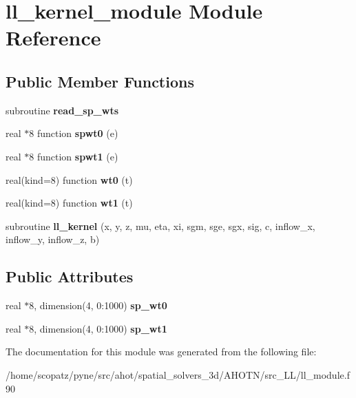\hypertarget{classll__kernel__module}{\section{ll\-\_\-kernel\-\_\-module Module Reference}
\label{classll__kernel__module}
}
\subsection*{Public Member Functions}
\begin{DoxyCompactItemize}
\item 
\hypertarget{classll__kernel__module_ae64b1d2d995c0e8c9d1014c83252100a}{subroutine {\bfseries read\-\_\-sp\-\_\-wts}}\label{classll__kernel__module_ae64b1d2d995c0e8c9d1014c83252100a}

\item 
\hypertarget{classll__kernel__module_abd3403d056c55f29237c37458c205516}{real $\ast$8 function {\bfseries spwt0} (e)}\label{classll__kernel__module_abd3403d056c55f29237c37458c205516}

\item 
\hypertarget{classll__kernel__module_a79e47a1da308cac21d2f614706b336a5}{real $\ast$8 function {\bfseries spwt1} (e)}\label{classll__kernel__module_a79e47a1da308cac21d2f614706b336a5}

\item 
\hypertarget{classll__kernel__module_a0f8329a7949f76c5316682e710a76f11}{real(kind=8) function {\bfseries wt0} (t)}\label{classll__kernel__module_a0f8329a7949f76c5316682e710a76f11}

\item 
\hypertarget{classll__kernel__module_a8e6ae1b763dd657b55e2eba5bd311e2f}{real(kind=8) function {\bfseries wt1} (t)}\label{classll__kernel__module_a8e6ae1b763dd657b55e2eba5bd311e2f}

\item 
\hypertarget{classll__kernel__module_a27d3794c74e14ccbb0297fd8ebdccdd3}{subroutine {\bfseries ll\-\_\-kernel} (x, y, z, mu, eta, xi, sgm, sge, sgx, sig, c, inflow\-\_\-x, inflow\-\_\-y, inflow\-\_\-z, b)}\label{classll__kernel__module_a27d3794c74e14ccbb0297fd8ebdccdd3}

\end{DoxyCompactItemize}
\subsection*{Public Attributes}
\begin{DoxyCompactItemize}
\item 
\hypertarget{classll__kernel__module_a4f8600d6061bd3d372282cac9efbab25}{real $\ast$8, dimension(4, 0\-:1000) {\bfseries sp\-\_\-wt0}}\label{classll__kernel__module_a4f8600d6061bd3d372282cac9efbab25}

\item 
\hypertarget{classll__kernel__module_ae9ebcee33ee11a014a911c8f1552c216}{real $\ast$8, dimension(4, 0\-:1000) {\bfseries sp\-\_\-wt1}}\label{classll__kernel__module_ae9ebcee33ee11a014a911c8f1552c216}

\end{DoxyCompactItemize}


The documentation for this module was generated from the following file\-:\begin{DoxyCompactItemize}
\item 
/home/scopatz/pyne/src/ahot/spatial\-\_\-solvers\-\_\-3d/\-A\-H\-O\-T\-N/src\-\_\-\-L\-L/ll\-\_\-module.\-f90\end{DoxyCompactItemize}

